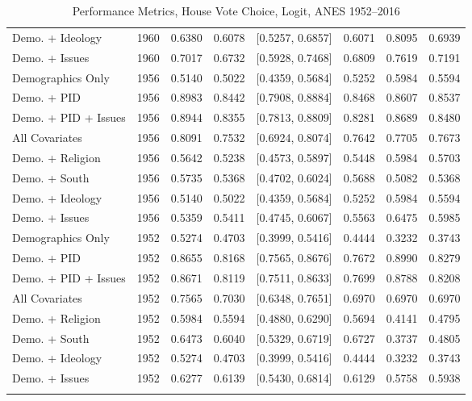 \begin{longtable}{lrrrlrrr}
  Demo. + Ideology & 1960 & 0.6380 & 0.6078 & [0.5257, 0.6857] & 0.6071 & 0.8095 & 0.6939 \\ 
  Demo. + Issues & 1960 & 0.7017 & 0.6732 & [0.5928, 0.7468] & 0.6809 & 0.7619 & 0.7191 \\ 
  Demographics Only & 1956 & 0.5140 & 0.5022 & [0.4359, 0.5684] & 0.5252 & 0.5984 & 0.5594 \\ 
  Demo. + PID & 1956 & 0.8983 & 0.8442 & [0.7908, 0.8884] & 0.8468 & 0.8607 & 0.8537 \\ 
  Demo. + PID + Issues & 1956 & 0.8944 & 0.8355 & [0.7813, 0.8809] & 0.8281 & 0.8689 & 0.8480 \\ 
  All Covariates & 1956 & 0.8091 & 0.7532 & [0.6924, 0.8074] & 0.7642 & 0.7705 & 0.7673 \\ 
  Demo. + Religion & 1956 & 0.5642 & 0.5238 & [0.4573, 0.5897] & 0.5448 & 0.5984 & 0.5703 \\ 
  Demo. + South & 1956 & 0.5735 & 0.5368 & [0.4702, 0.6024] & 0.5688 & 0.5082 & 0.5368 \\ 
  Demo. + Ideology & 1956 & 0.5140 & 0.5022 & [0.4359, 0.5684] & 0.5252 & 0.5984 & 0.5594 \\ 
  Demo. + Issues & 1956 & 0.5359 & 0.5411 & [0.4745, 0.6067] & 0.5563 & 0.6475 & 0.5985 \\ 
  Demographics Only & 1952 & 0.5274 & 0.4703 & [0.3999, 0.5416] & 0.4444 & 0.3232 & 0.3743 \\ 
  Demo. + PID & 1952 & 0.8655 & 0.8168 & [0.7565, 0.8676] & 0.7672 & 0.8990 & 0.8279 \\ 
  Demo. + PID + Issues & 1952 & 0.8671 & 0.8119 & [0.7511, 0.8633] & 0.7699 & 0.8788 & 0.8208 \\ 
  All Covariates & 1952 & 0.7565 & 0.7030 & [0.6348, 0.7651] & 0.6970 & 0.6970 & 0.6970 \\ 
  Demo. + Religion & 1952 & 0.5984 & 0.5594 & [0.4880, 0.6290] & 0.5694 & 0.4141 & 0.4795 \\ 
  Demo. + South & 1952 & 0.6473 & 0.6040 & [0.5329, 0.6719] & 0.6727 & 0.3737 & 0.4805 \\ 
  Demo. + Ideology & 1952 & 0.5274 & 0.4703 & [0.3999, 0.5416] & 0.4444 & 0.3232 & 0.3743 \\ 
  Demo. + Issues & 1952 & 0.6277 & 0.6139 & [0.5430, 0.6814] & 0.6129 & 0.5758 & 0.5938 \\ 
   \bottomrule
\caption{Performance Metrics, House Vote Choice, Logit, ANES 1952--2016} 
\label{tab:ANES_house_logit}
\end{longtable}
